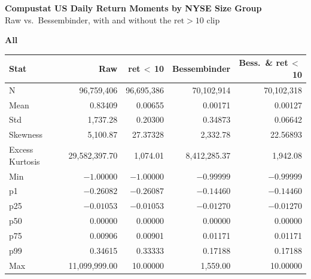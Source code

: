 \documentclass[10pt]{article}
\begin{document}
\thispagestyle{empty}
\begin{center}
{\large\bfseries Compustat US Daily Return Moments by NYSE Size Group}\\[2pt]
{\small Raw vs.\ Bessembinder, with and without the $\mathrm{ret}>10$ clip}
\end{center}
\vspace{0.6em}
\begin{center}
\footnotesize
\textbf{All}\\[2pt]
\begin{tabular}{l r r r r}
\toprule
Stat & {Raw} & {ret\,$<$\,10} & {Bessembinder} & {Bess.\ \& ret\,$<$\,10} \\
\midrule
N & 96,759,406 & 96,695,386 & 70,102,914 & 70,102,318 \\
Mean & 0.83409 & 0.00655 & 0.00171 & 0.00127 \\
Std & 1,737.28 & 0.20300 & 0.34873 & 0.06642 \\
Skewness & 5,100.87 & 27.37328 & 2,332.78 & 22.56893 \\
Excess Kurtosis & 29,582,397.70 & 1,074.01 & 8,412,285.37 & 1,942.08 \\
Min & $-1.00000$ & $-1.00000$ & $-0.99999$ & $-0.99999$ \\
p1 & $-0.26082$ & $-0.26087$ & $-0.14460$ & $-0.14460$ \\
p25 & $-0.01053$ & $-0.01053$ & $-0.01270$ & $-0.01270$ \\
p50 & 0.00000 & 0.00000 & 0.00000 & 0.00000 \\
p75 & 0.00906 & 0.00901 & 0.01171 & 0.01171 \\
p99 & 0.34615 & 0.33333 & 0.17188 & 0.17188 \\
Max & 11,099,999.00 & 10.00000 & 1,559.00 & 10.00000 \\
\bottomrule
\end{tabular}


\end{center}
\end{document}
